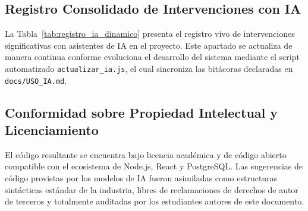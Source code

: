 \subsection{Registro Consolidado de Intervenciones con IA}
La Tabla~\ref{tab:registro_ia_dinamico} presenta el registro vivo de intervenciones significativas con asistentes de IA en el proyecto. Este apartado se actualiza de manera continua conforme evoluciona el desarrollo del sistema mediante el script automatizado \texttt{actualizar\_ia.js}, el cual sincroniza las bitácoras declaradas en \texttt{docs/USO\_IA.md}.



\subsection{Conformidad sobre Propiedad Intelectual y Licenciamiento}
El código resultante se encuentra bajo licencia académica y de código abierto compatible con el ecosistema de Node.js, React y PostgreSQL. Las sugerencias de código provistas por los modelos de IA fueron asimiladas como estructuras sintácticas estándar de la industria, libres de reclamaciones de derechos de autor de terceros y totalmente auditadas por los estudiantes autores de este documento.
